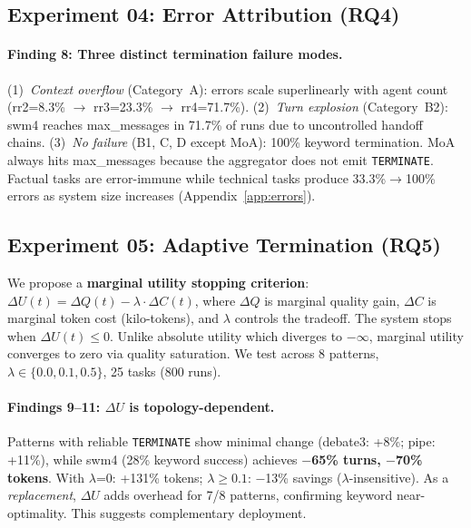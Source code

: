 \documentclass{article}
\begin{document}
\subsection{Experiment 04: Error Attribution (RQ4)}
\label{sec:exp04}

\paragraph{Finding 8: Three distinct termination failure modes.} (1)~\emph{Context overflow} (Category~A): errors scale superlinearly with agent count (rr2=8.3\% $\to$ rr3=23.3\% $\to$ rr4=71.7\%). (2)~\emph{Turn explosion} (Category~B2): swm4 reaches max\_messages in 71.7\% of runs due to uncontrolled handoff chains. (3)~\emph{No failure} (B1, C, D except MoA): 100\% keyword termination. MoA always hits max\_messages because the aggregator does not emit \texttt{TERMINATE}. Factual tasks are error-immune while technical tasks produce 33.3\%$\to$100\% errors as system size increases (Appendix~\ref{app:errors}).

\subsection{Experiment 05: Adaptive Termination (RQ5)}
\label{sec:exp05}

We propose a \textbf{marginal utility stopping criterion}: $\Delta U(t) = \Delta Q(t) - \lambda \cdot \Delta C(t)$, where $\Delta Q$ is marginal quality gain, $\Delta C$ is marginal token cost (kilo-tokens), and $\lambda$ controls the tradeoff. The system stops when $\Delta U(t) \leq 0$. Unlike absolute utility which diverges to $-\infty$, marginal utility converges to zero via quality saturation. We test across 8 patterns, $\lambda \in \{0.0, 0.1, 0.5\}$, 25 tasks (800 runs).

\paragraph{Findings 9--11: $\Delta U$ is topology-dependent.} Patterns with reliable \texttt{TERMINATE} show minimal change (debate3: +8\%; pipe: +11\%), while swm4 (28\% keyword success) achieves \textbf{$-$65\% turns, $-$70\% tokens}. With $\lambda$=0: +131\% tokens; $\lambda \geq 0.1$: $-$13\% savings ($\lambda$-insensitive). As a \emph{replacement}, $\Delta U$ adds overhead for 7/8 patterns, confirming keyword near-optimality. This suggests complementary deployment.
\end{document}
